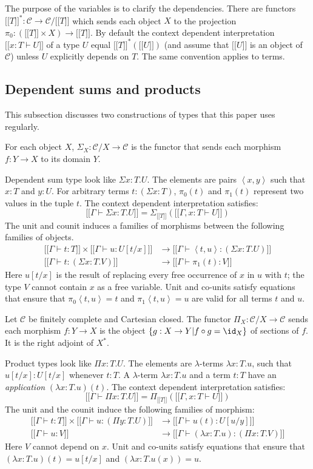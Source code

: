 \documentclass{tac}
\newcommand\cat\mathcal
\newcommand\set[1]{\left\{#1\right\}}
\newcommand\ri{^*}
\newcommand\of{:}
\newcommand\db[1]{{[\![}#1{]\!]}}
\newcommand\dsum{\Sigma_}
\newcommand\dprod{\Pi_}
\newcommand\tuplet[1]{\left\langle #1 \right\rangle}
\begin{document}
The purpose of the variables is to clarify the dependencies. There are functors $\db T\ri\of\cat C\to \cat C/\db T$ which sends each object $X$ to the projection $\pi_0\of(\db T\times X)\to \db T$. By default the context dependent interpretation $\db{x\of T\vdash U}$ of a type $U$ equal $\db T\ri(\db U)$ (and assume that $\db U$ is an object of $\cat C$) unless $U$ explicitly depends on $T$. The same convention applies to terms.

\subsection{Dependent sums and products}
This subsection discusses two constructions of types that this paper uses regularly.


For each object $X$, $\dsum X\of\cat C/X\to \cat C$ is the functor that sends each morphism $f\of Y\to X$ to its domain $Y$.

Dependent sum type look like $\Sigma x\of T.U$. The elements are pairs $\tuplet{x,y}$ such that $x\of T$ and $y\of U$. For arbitrary terms $t\of(\Sigma x\of T)$, $\pi_0(t)$ and $\pi_1(t)$ represent two values in the tuple $t$. The context dependent interpretation satisfies:
\[ \db{\Gamma\vdash\Sigma x\of T.U} = \dsum {\db T}(\db{\Gamma,x\of T\vdash U}) \]
The unit and counit induces a families of morphisms between the following families of objects.
\begin{align*}
\db{\Gamma\vdash t\of T}\times\db{\Gamma\vdash u\of U[t/x]} &\to \db{\Gamma\vdash \tuplet{t, u}\of(\Sigma x\of T.U)}\\
\db{\Gamma\vdash t\of (\Sigma x\of T.V)}&\to \db{\Gamma\vdash \pi_1(t) \of V}
\end{align*}
Here $u[t/x]$ is the result of replacing every free occurrence of $x$ in $u$ with $t$; the type $V$ cannot contain $x$ as a free variable. Unit and co-units satisfy equations that ensure that $\pi_0\tuplet{t,u}=t$ and $\pi_1\tuplet{t,u}=u$ are valid for all terms $t$ and $u$.

Let $\cat C$ be finitely complete and Cartesian closed. The functor $\dprod X\of\cat C/X\to \cat C$ sends each morphism $f\of Y\to X$ is the object $\set{g\of X\to Y| f\circ g = \id_X }$ of sections of $f$. It is the right adjoint of $X\ri$.

Product types look like $\Pi x\of T.U$. The elements are $\lambda$-terms $\lambda x\of T.u$, such that $u[t/x]\of U[t/x]$ whenever $t\of T$. A $\lambda$-term $\lambda x\of T.u$ and a term $t\of T$ have an \emph{application} $(\lambda x\of T.u)(t)$. The context dependent interpretation satisfies:
\[ \db{\Gamma\vdash\Pi x\of T.U} = \dprod {\db T}(\db{\Gamma,x\of T\vdash U}) \]
The unit and the counit induce the following families of morphism:
\begin{align*}
\db{\Gamma\vdash t\of T}\times\db{\Gamma\vdash u\of(\Pi y\of T.U)}&\to\db{\Gamma\vdash u(t)\of U[u/y]}\\
\db{\Gamma\vdash u\of V}&\to\db{\Gamma\vdash (\lambda x\of T.u)\of(\Pi x\of T.V)}
\end{align*}
Here $V$ cannot depend on $x$. Unit and co-units satisfy equations that ensure that $(\lambda x\of T.u)(t) = u[t/x]$ and $(\lambda x\of T.u(x))=u$.
\end{document}
